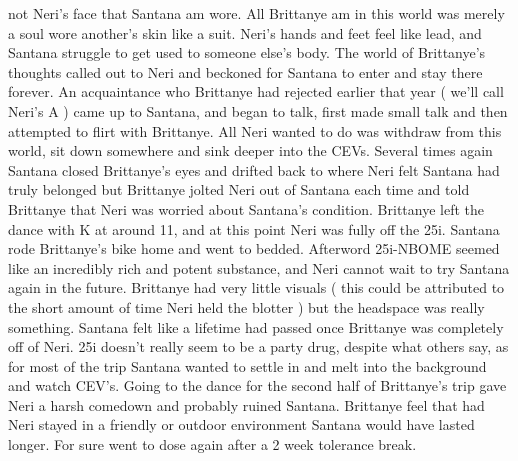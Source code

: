 \documentclass[12pt]{book}
\begin{document}
not Neri's face that Santana am wore. All Brittanye am in this world was merely a soul wore another's skin like a suit. Neri's hands and feet feel like lead, and Santana struggle to get used to someone else's body. The world of Brittanye's thoughts called out to Neri and beckoned for Santana to enter and stay there forever. An acquaintance who Brittanye had rejected earlier that year ( we'll call Neri's A ) came up to Santana, and began to talk, first made small talk and then attempted to flirt with Brittanye. All Neri wanted to do was withdraw from this world, sit down somewhere and sink deeper into the CEVs. Several times again Santana closed Brittanye's eyes and drifted back to where Neri felt Santana had truly belonged but Brittanye jolted Neri out of Santana each time and told Brittanye that Neri was worried about Santana's condition. Brittanye left the dance with K at around 11, and at this point Neri was fully off the 25i. Santana rode Brittanye's bike home and went to bedded. Afterword 25i-NBOME seemed like an incredibly rich and potent substance, and Neri cannot wait to try Santana again in the future. Brittanye had very little visuals ( this could be attributed to the short amount of time Neri held the blotter ) but the headspace was really something. Santana felt like a lifetime had passed once Brittanye was completely off of Neri. 25i doesn't really seem to be a party drug, despite what others say, as for most of the trip Santana wanted to settle in and melt into the background and watch CEV's. Going to the dance for the second half of Brittanye's trip gave Neri a harsh comedown and probably ruined Santana. Brittanye feel that had Neri stayed in a friendly or outdoor environment Santana would have lasted longer. For sure went to dose again after a 2 week tolerance break.
\end{document}
